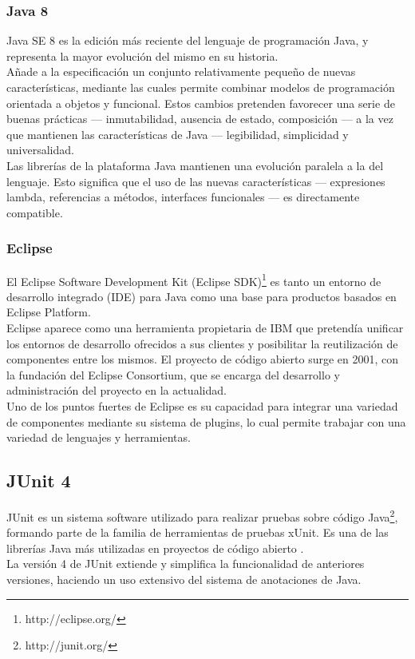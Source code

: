 \subsubsection{Java 8}
Java SE 8 es la edición más reciente del lenguaje de programación Java, y representa la mayor evolución del mismo en su historia.
\\
Añade a la especificación un conjunto relativamente pequeño de nuevas características, mediante las cuales permite combinar modelos de programación orientada a objetos y funcional.
Estos cambios pretenden favorecer una serie de buenas prácticas --- inmutabilidad, ausencia de estado, composición --- a la vez que mantienen las características de Java --- legibilidad, simplicidad y universalidad.
\\
Las librerías de la plataforma Java mantienen una evolución paralela a la del lenguaje.
Esto significa que el uso de las nuevas características --- expresiones lambda, referencias a métodos, interfaces funcionales --- es directamente compatible.
\cite{jls8}

\subsubsection{Eclipse}
El Eclipse Software Development Kit (Eclipse SDK)\footnote{http://eclipse.org/} es tanto un entorno de desarrollo integrado (IDE) para Java como una base para productos basados en Eclipse Platform.
\\
Eclipse aparece como una herramienta propietaria de IBM que pretendía unificar los entornos de desarrollo ofrecidos a sus clientes y posibilitar la reutilización de componentes entre los mismos.
El proyecto de código abierto surge en 2001, con la fundación del Eclipse Consortium, que se encarga del desarrollo y administración del proyecto en la actualidad. \cite{website:eclipseFAQ}
\\
Uno de los puntos fuertes de Eclipse es su capacidad para integrar una variedad de componentes mediante su sistema de plugins, lo cual permite trabajar con una variedad de lenguajes y herramientas.

\subsection{JUnit 4}
JUnit es un sistema software utilizado para realizar pruebas sobre código Java\footnote{http://junit.org/}, formando parte de la familia de herramientas de pruebas xUnit.
Es una de las librerías Java más utilizadas en proyectos de código abierto \cite{website:githubTOP}.
\\
La versión 4 de JUnit extiende y simplifica la funcionalidad de anteriores versiones, haciendo un uso extensivo del sistema de anotaciones de Java.

